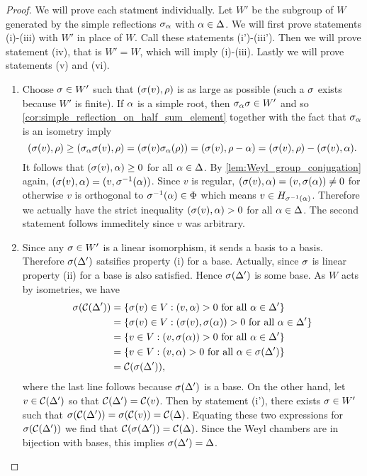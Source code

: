 \documentclass[12pt,reqno,oneside]{amsart}
\begin{document}
    \begin{proof}
        We will prove each statment individually. Let $W'$ be the subgroup of $W$ generated by the simple reflections $\sigma_{\alpha}$ with $\alpha \in \Delta$. We will first prove statements (i)-(iii) with $W'$ in place of $W$. Call these statements (i')-(iii'). Then we will prove statement (iv), that is $W' = W$, which will imply (i)-(iii). Lastly we will prove statements (v) and (vi).
        \begin{enumerate}[label=(\roman*')]
            \item Choose $\sigma \in W'$ such that $(\sigma(v),\rho)$ is as large as possible (such a $\sigma$ exists because $W'$ is finite). If $\alpha$ is a simple root, then $\sigma_{\alpha}\sigma \in W'$ and so \cref{cor:simple_reflection_on_half_sum_element} together with the fact that $\sigma_{\alpha}$ is an isometry imply
            \[
                (\sigma(v),\rho) \ge (\sigma_{\alpha}\sigma(v),\rho) = (\sigma(v)\sigma_{\alpha}(\rho)) = (\sigma(v),\rho-\alpha) = (\sigma(v),\rho)-(\sigma(v),\alpha).
            \]
            It follows that $(\sigma(v),\alpha) \ge 0$ for all $\alpha \in \Delta$. By \cref{lem:Weyl_group_conjugation} again, $(\sigma(v),\alpha) = (v,\sigma^{-1}(\alpha))$. Since $v$ is regular, $(\sigma(v),\alpha) = (v,\sigma(\alpha)) \neq 0$ for otherwise $v$ is orthogonal to $\sigma^{-1}(\alpha) \in \Phi$ which means $v \in H_{\sigma^{-1}(\alpha)}$. Therefore we actually have the strict inequality $(\sigma(v),\alpha) > 0$ for all $\alpha \in \Delta$. The second statement follows immeditely since $v$ was arbitrary.
            \item Since any $\sigma \in W'$ is a linear isomorphism, it sends a basis to a basis. Therefore $\sigma(\Delta')$ satsifies property (i) for a base. Actually, since $\sigma$ is linear property (ii) for a base is also satisfied. Hence $\sigma(\Delta')$ is some base. As $W$ acts by isometries, we have
            \begin{align*}
                \sigma(\mathcal{C}(\Delta')) &= \{\sigma(v) \in V:(v,\alpha) > 0 \text{ for all } \alpha \in \Delta'\} \\
                &= \{\sigma(v) \in V:(\sigma(v),\sigma(\alpha)) > 0 \text{ for all } \alpha \in \Delta'\} \\
                &= \{v \in V:(v,\sigma(\alpha)) > 0 \text{ for all } \alpha \in \Delta'\} \\
                &= \{v \in V:(v,\alpha) > 0 \text{ for all } \alpha \in \sigma(\Delta')\} \\
                &= \mathcal{C}(\sigma(\Delta')),
            \end{align*}
            where the last line follows because $\sigma(\Delta')$ is a base. On the other hand, let $v \in \mathcal{C}(\Delta')$ so that $\mathcal{C}(\Delta') = \mathcal{C}(v)$. Then by statement (i'), there exists $\sigma \in W'$ such that $\sigma(\mathcal{C}(\Delta')) = \sigma(\mathcal{C}(v)) = \mathcal{C}(\Delta)$. Equating these two expressions for $\sigma(\mathcal{C}(\Delta'))$ we find that $\mathcal{C}(\sigma(\Delta')) = \mathcal{C}(\Delta)$. Since the Weyl chambers are in bijection with bases, this implies $\sigma(\Delta') = \Delta$.

\end{enumerate}
\end{proof}
\end{document}
